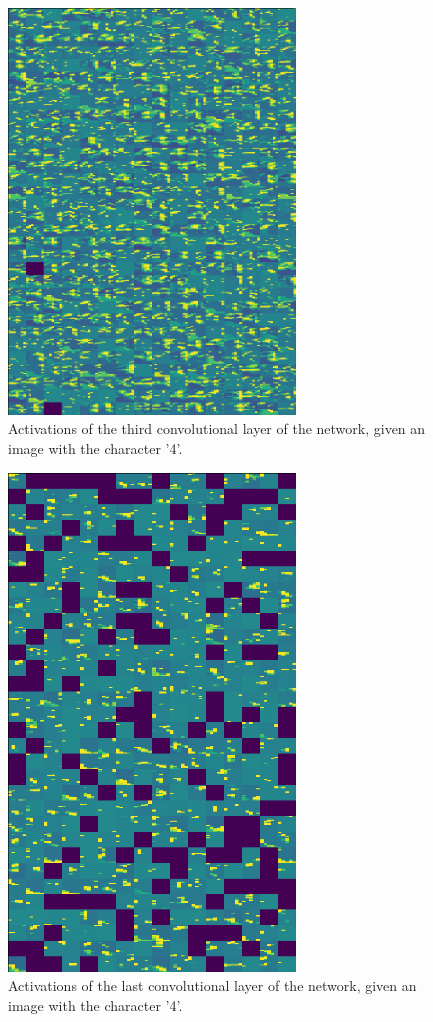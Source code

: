 \documentclass[journal]{IEEEtran}
\begin{document}
\begin{figure}[!t]
\centering
\includegraphics[width=3in]{images/activation_conv3_4.png}
\caption{Activations of the third convolutional layer of the network, given an image with the character '4'.}
\label{activation_3}
\end{figure}

\begin{figure}[!t]
\centering
\includegraphics[width=3in]{images/activation_conv4_4.png}
\caption{Activations of the last convolutional layer of the network, given an image with the character '4'.}
\label{activation_4}
\end{figure}
\end{document}

